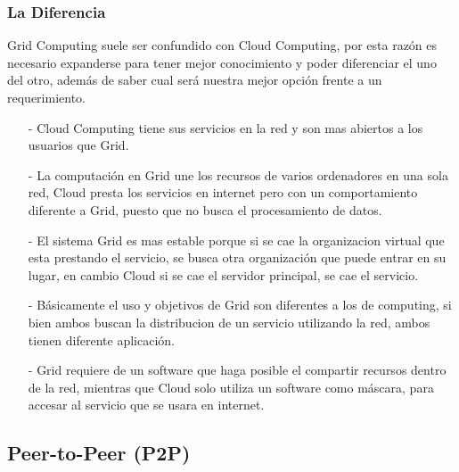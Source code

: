 \documentclass[12pt]{article}
\begin{document}
{{\subsubsection{La Diferencia}
Grid Computing suele ser confundido con Cloud Computing, por esta raz\'on es necesario expanderse para tener mejor conocimiento y poder diferenciar el uno del otro, adem\'as de saber cual ser\'a nuestra mejor opci\'on frente a un requerimiento.\\
\begin{itemize}
\item[-]Cloud Computing tiene sus servicios en la red y son mas abiertos a los usuarios que Grid.
\item[-]La computaci\'on en Grid une los recursos de varios ordenadores en una sola red,  Cloud presta los servicios en internet pero con un comportamiento diferente a Grid, puesto que no busca el procesamiento de datos.
\item[-]El sistema Grid es mas estable porque si se cae la organizacion virtual que esta prestando el servicio, se busca otra organizaci\'on que puede entrar en su lugar, en cambio Cloud si se cae el servidor principal, se cae el servicio.
\item[-]B\'asicamente el uso y objetivos de Grid son diferentes a los de computing, si bien ambos buscan la distribucion de un servicio utilizando la red, ambos tienen diferente aplicaci\'on.
\item[-]Grid requiere de un software que haga posible el compartir recursos dentro de la red, mientras que Cloud solo utiliza un software como m\'ascara, para accesar al servicio que se usara en internet.
\end{itemize}
}

\newpage
{\raggedright
\subsection{Peer-to-Peer (P2P)}
}}
\end{document}
